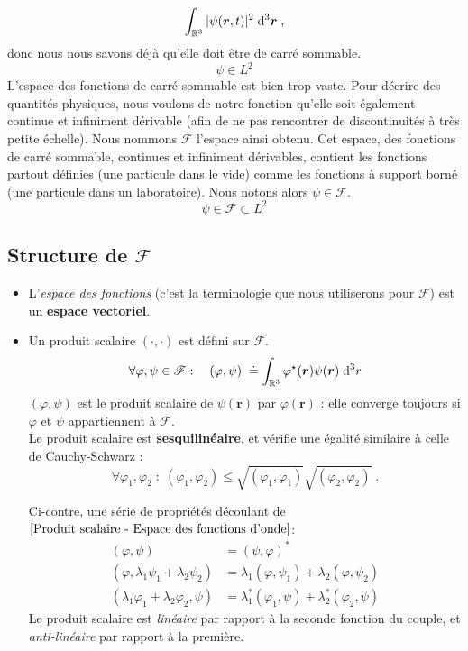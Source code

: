 \documentclass[../notesdecours.tex]{subfiles}
\begin{document}
$$ \int_{\mathbb R ^3} |\psi(\bm{r}, t)| ^2 \; \mathrm{d} ^3 \bm{r} \; ,$$
donc nous nous savons déjà qu'elle doit être de carré sommable.
$$\psi \in L^2$$
L'espace des fonctions de carré sommable est bien trop vaste. Pour décrire des quantités physiques, nous voulons de notre fonction qu'elle soit également continue et infiniment dérivable (afin de ne pas rencontrer de discontinuités à très petite échelle). Nous nommons $\mathcal F$ l'espace ainsi obtenu. Cet espace, des fonctions de carré sommable, continues et infiniment dérivables, contient les fonctions partout définies (une particule dans le vide) comme les fonctions à support borné (une particule dans un laboratoire). Nous notons alors $\psi \in \mathcal{F}$.
$$\psi \in \mathcal{F} \subset L^2$$

\subsection{Structure de $\mathcal{F}$}
\begin{itemize}
\item L'\textit{espace des fonctions} (c'est la terminologie que nous utiliserons pour $\mathcal F$) est un \textbf{espace vectoriel}. \\
\item Un produit scalaire $(\cdot, \cdot)$ est défini sur $\mathcal F$.
\begin{equation}
\forall \varphi, \psi \in \mathcal F : \quad (\varphi, \psi)\;   \doteq \int_{\mathbb R ^3} \varphi ^\star(\bm{r}) \psi(\bm{r}) \; \mathrm{d} ^3 r
\label{Produit scalaire - Espace des fonctions d'onde}
\end{equation}
$(\varphi,\psi)$ est le produit scalaire de $\psi(\bm{r})$ par $\varphi(\bm{r})$ : elle converge toujours si $\varphi$ et $\psi$ appartiennent à $\mathcal{F}$.\\

Le produit scalaire est \textbf{sesquilinéaire}, et vérifie une égalité similaire à celle de Cauchy-Schwarz : 
$$ \forall \varphi_1, \varphi_2 \; : \; (\varphi_1, \varphi_2) \leq \sqrt{(\varphi_1, \varphi_1)}\sqrt{(\varphi_2, \varphi_2)} \; .$$

Ci-contre, une série de propriétés découlant de $\ref{Produit scalaire - Espace des fonctions d'onde}$:
\begin{align*}
(\varphi,\psi) &= (\psi,\varphi)^*\\
(\varphi,\lambda_1\psi_1 + \lambda_2\psi_2) &= \lambda_1 (\varphi,\psi_1) + \lambda_2 (\varphi,\psi_2)\\
(\lambda_1\varphi_1 + \lambda_2\varphi_2,\psi) &= \lambda_1^* (\varphi_1,\psi) + \lambda_2^* (\varphi_2,\psi)
\end{align*}
Le produit scalaire est \emph{linéaire} par rapport à la seconde fonction du couple, et \emph{anti-linéaire} par rapport à la première.
\end{itemize}
\end{document}
